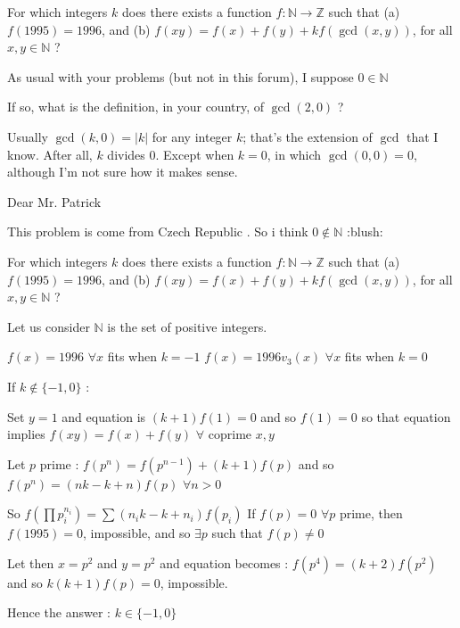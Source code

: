 \begin{solution}
	\begin{tcolorbox}For which integers $k$ does  there exists a function $f:\mathbb N \to \mathbb Z$ such that
(a) $f(1995)=1996$, and 
(b) $f(xy)=f(x)+f(y)+kf(\gcd(x,y)) $, for all $x,y\in\mathbb N$ ?\end{tcolorbox}
As usual with your problems (but not in this forum), I suppose $0\in\mathbb N$

If so, what is the definition, in your country, of $\gcd(2,0)$ ?
\end{solution}



\begin{solution}
	Usually $\gcd(k,0) = |k|$ for any integer $k$; that's the extension of $\gcd$ that I know. After all, $k$ divides $0$. Except when $k = 0$, in which $\gcd(0,0) = 0$, although I'm not sure how it makes sense.
\end{solution}



\begin{solution}
	Dear Mr. Patrick

This problem is come from Czech Republic . So i think $0\notin \mathbb N$  :blush:
\end{solution}



\begin{solution}
	\begin{tcolorbox}For which integers $k$ does  there exists a function $f:\mathbb N \to \mathbb Z$ such that
(a) $f(1995)=1996$, and 
(b) $f(xy)=f(x)+f(y)+kf(\gcd(x,y)) $, for all $x,y\in\mathbb N$ ?\end{tcolorbox}
Let us consider $\mathbb N$ is the set of positive integers.

$f(x)=1996$ $\forall x$ fits when $k=-1$
$f(x)=1996 v_3(x)$ $\forall x$ fits when $k=0$

If $k\notin\{-1,0\}$ :

Set $y=1$ and equation is $(k+1)f(1)=0$ and so $f(1)=0$ so that equation implies $f(xy)=f(x)+f(y)$ $\forall$ coprime $x,y$

Let $p$ prime : $f(p^n)=f(p^{n-1})+(k+1)f(p)$ and so $f(p^n)=(nk-k+n)f(p)$ $\forall n>0$

So $f(\prod p_i^{n_i})=\sum (n_ik-k+n_i)f(p_i)$
If $f(p)=0$ $\forall p$ prime, then $f(1995)=0$, impossible, and so $\exists p$ such that $f(p)\ne 0$

Let then $x=p^2$ and $y=p^2$ and equation becomes : $f(p^4)=(k+2)f(p^2)$ and so $k(k+1)f(p)=0$, impossible.

Hence the answer : $\boxed{k\in\{-1,0\}}$
\end{solution}



